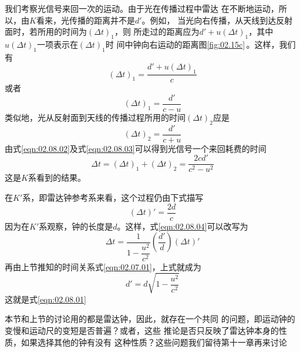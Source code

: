 我们考察光信号来回一次的运动。由于光在传播过程中雷达
在不断地运动，所以，由$K$看来，光传播的距离并不是$d'$。例如，
当光向右传播，从天线到达反射面时，若所用的时间为$\left(\Delta t\right)_1$，则
所走过的距离应为$ d ' + u \left( \Delta t \right) _ { 1 }$，其中$ u \left( \Delta t\right) _ { 1 } $一项表示在$\left(\Delta t\right)_1$时
间中钟向右运动的距离\lhbrak 图\ref{fig:02.15c}\,\rhbrak 。这样，我们有
\begin{equation*}
  \left( \Delta t \right) _ { 1 } = \frac { d ' + u \left(\Delta t\right)_1 } { c }
\end{equation*}
或者
\begin{equation}\label{eqn:02.08.02}
  \left( \Delta t \right) _ { 1 } = \frac { d ' } { c - u }
\end{equation}
类似地，光从反射面到天线的传播过程所用的时间$ \left(\Delta t\right)_2 $应是
\begin{equation}\label{eqn:02.08.03}
  \left( \Delta t \right) _ { 2 } = \frac { d ' } { c + u }
\end{equation}
由式\eqref{eqn:02.08.02}及式\eqref{eqn:02.08.03}可以得到光信号一个来回耗费的时间
\begin{equation}\label{eqn:02.08.04}
  \Delta t = \left( \Delta t \right) _ { 1 } + \left( \Delta t \right) _ { 2 } =  \frac { 2 c d ' } { c ^ { 2 } - u ^ { 2 } }
\end{equation}
这是$K$系看到的结果。

在$K'$系，即雷达钟参考系来看，这个过程仍由下式描写
\begin{equation*}
  \left( \Delta t \right) ' = \frac { 2 d } { c }
\end{equation*}
因为在$K'$系观察，钟的长度是$d$。这样，式\eqref{eqn:02.08.04}可以改写为
\begin{equation*}
  \Delta t = \frac { 1 } { 1 - \dfrac { u ^ { 2 } } { c ^ { 2 } } } \left ( \frac { d ' } { d } \right) \left( \Delta t \right) '
\end{equation*}
再由上节推知的时间关系式\eqref{eqn:02.07.01}，上式就成为
\begin{equation*}
  d ' = d \sqrt { 1 - \frac { u ^ { 2 } } { c ^ { 2 } } }
\end{equation*}
\clearpage
\noindent 这就是式\eqref{eqn:02.08.01}

本节和上节的讨论用的都是雷达钟，因此，就存在一个共同
的问题，即运动钟的变慢和运动尺的变短是否普遍？或者，这些
推论是否只反映了雷达钟本身的性质，如果选择其他的钟有没有
这种性质？这些问题我们留待第十一章再来讨论
